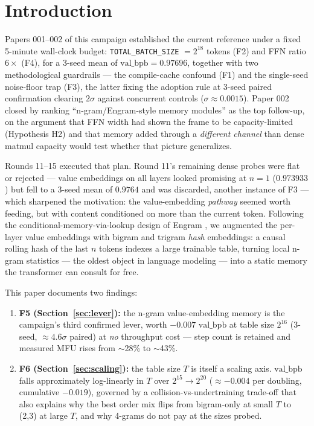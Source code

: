 \documentclass{article}
\newcommand{\valbpb}{\mathrm{val\_bpb}}
\begin{document}
\section{Introduction}
\label{sec:intro}

Papers 001--002 of this campaign \cite{ophis2026paper001,ophis2026paper002} established the current reference under a fixed 5-minute wall-clock budget: \texttt{TOTAL\_BATCH\_SIZE} $=2^{18}$ tokens (F2) and FFN ratio $6\times$ (F4), for a 3-seed mean of $\valbpb = 0.97696$, together with two methodological guardrails --- the compile-cache confound (F1) and the single-seed noise-floor trap (F3), the latter fixing the adoption rule at 3-seed paired confirmation clearing $2\sigma$ against concurrent controls ($\sigma \approx 0.0015$). Paper 002 closed by ranking ``n-gram/Engram-style memory modules'' as the top follow-up, on the argument that FFN width had shown the frame to be capacity-limited (Hypothesis H2) and that memory added through a \emph{different channel} than dense matmul capacity would test whether that picture generalizes.

Rounds 11--15 executed that plan. Round 11's remaining dense probes were flat or rejected --- value embeddings on all layers looked promising at $n{=}1$ ($0.973933$) but fell to a 3-seed mean of $0.9764$ and was discarded, another instance of F3 --- which sharpened the motivation: the value-embedding \emph{pathway} seemed worth feeding, but with content conditioned on more than the current token. Following the conditional-memory-via-lookup design of Engram \cite{engram2026}, we augmented the per-layer value embeddings with bigram and trigram \emph{hash} embeddings: a causal rolling hash of the last $n$ tokens indexes a large trainable table, turning local n-gram statistics --- the oldest object in language modeling \cite{bengio2003neural} --- into a static memory the transformer can consult for free.

This paper documents two findings:

\begin{enumerate}
    \item \textbf{F5 (Section~\ref{sec:lever}):} the n-gram value-embedding memory is the campaign's third confirmed lever, worth $-0.007$ $\valbpb$ at table size $2^{16}$ (3-seed, $\approx 4.6\sigma$ paired) at \emph{no} throughput cost --- step count is retained and measured MFU rises from $\sim$28\% to $\sim$43\%.
    \item \textbf{F6 (Section~\ref{sec:scaling}):} the table size $T$ is itself a scaling axis. $\valbpb$ falls approximately log-linearly in $T$ over $2^{15} \rightarrow 2^{20}$ ($\approx -0.004$ per doubling, cumulative $-0.019$), governed by a collision-vs-undertraining trade-off that also explains why the best order mix flips from bigram-only at small $T$ to (2,3) at large $T$, and why 4-grams do not pay at the sizes probed.
\end{enumerate}
\end{document}
